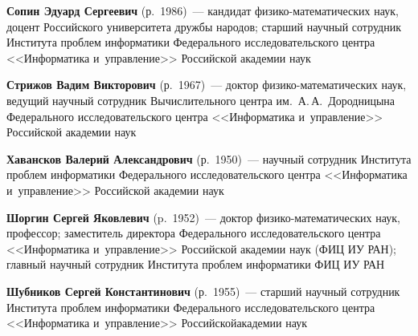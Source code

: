 \begin{multicols}{2}
\vspace*{3pt} 

\noindent
\textbf{Сопин Эдуард Сергеевич} (р.\ 1986)~--- 
кандидат фи\-зи\-ко-ма\-те\-ма\-ти\-че\-ских наук, доцент Российского университета 
дружбы народов; старший научный сотруд\-ник Института проб\-лем 
информатики
 Федерального исследовательского центра <<Информатика и~управ\-ле\-ние>>
 Российской академии наук

\vspace*{3pt} 

\noindent
\textbf{Стрижов Вадим Викторович} (р.\ 1967)~--- 
доктор фи\-зи\-ко-ма\-те\-ма\-ти\-че\-ских наук, 
ведущий научный сотрудник Вычислительного центра им.\ А.\,А.~Дородницына 
Федерального исследовательского центра <<Информатика и~управ\-ле\-ние>> 
Российской академии наук

\vspace*{3pt} 

\noindent
\textbf{Хавансков Валерий Александрович} (р.\ 1950)~--- 
научный сотрудник Института проб\-лем информатики Федерального 
исследовательского центра <<Информатика и~управ\-ле\-ние>> Российской академии наук 

\vspace*{3pt} 

\noindent
\textbf{Шоргин Сергей Яковлевич} (p.\ 1952)~---
доктор фи\-зи\-ко-ма\-те\-ма\-ти\-че\-ских наук, профессор; заместитель 
директора Федерального исследовательского центра <<Информатика и~управ\-ле\-ние>>
Российской академии наук (ФИЦ ИУ РАН); главный научный сотрудник Института 
проб\-лем информатики ФИЦ ИУ РАН


\vspace*{3pt} 

\noindent
\textbf{Шубников Сергей Константинович} (р.\ 1955)~---
старший научный сотрудник Института проб\-лем информатики Федерального 
исследовательского центра <<Информатика и~управ\-ле\-ние>> Российской\linebreak академии наук








 \label{end\stat}






\end{multicols}

\newpage